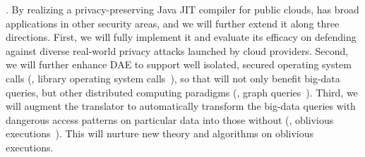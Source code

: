 

. By realizing a privacy-preserving Java JIT compiler 
for public clouds, \maat has broad applications in other security areas, and we 
will further extend it along three directions. First, we will fully implement 
it and evaluate its efficacy on defending against diverse real-world privacy 
attacks launched by cloud providers. Second, we will further enhance DAE to 
support well isolated, secured operating system calls (\eg, library operating 
system calls~\cite{graphene:atc17}), so that \maat will not only benefit 
big-data queries, but other distributed computing paradigms (\eg, graph 
queries~\cite{sigmod10:pregel}). Third, we will augment the translator to 
automatically transform the big-data queries with dangerous access patterns on 
particular data into those without (\ie, 
oblivious executions~\cite{bigmatrix:ccs17}). This will nurture new theory and 
algorithms on oblivious executions. 



